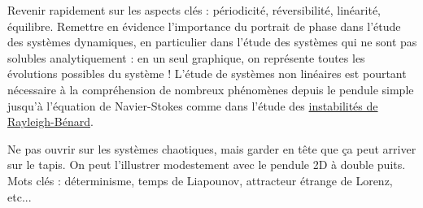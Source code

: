 Revenir rapidement sur les aspects clés : périodicité, réversibilité, linéarité, équilibre.
Remettre en évidence l'importance du portrait de phase dans l'étude des systèmes dynamiques, en particulier dans l'étude des systèmes qui ne sont pas solubles analytiquement : en un seul graphique, on représente toutes les évolutions possibles du système !
L'étude de systèmes non linéaires est pourtant nécessaire à la compréhension de nombreux phénomènes depuis le pendule simple jusqu'à l'équation de Navier-Stokes comme dans l'étude des \href{https://fr.wikipedia.org/wiki/Instabilit\%C3\%A9_de_Rayleigh-B\%C3\%A9nard}{instabilités de Rayleigh-Bénard}.

Ne pas ouvrir sur les systèmes chaotiques, mais garder en tête que ça peut arriver sur le tapis.
On peut l'illustrer modestement avec le pendule 2D à double puits.
Mots clés : déterminisme, temps de Liapounov, attracteur étrange de Lorenz, etc... 

\newpage